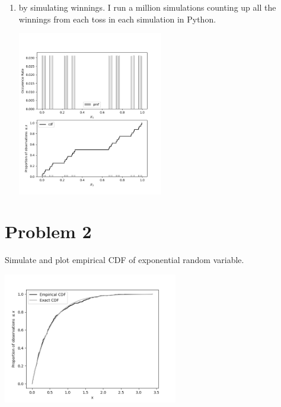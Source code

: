 \documentclass{article}
\newcommand{\1}{\mathbf{1}}
\begin{document}
\begin{enumerate}
	\newpage
	\item by simulating winnings. I run a million simulations counting up all the winnings from each toss in each simulation in Python.
	\begin{center}
    \includegraphics[width=2.5in]{STATS509/HW2/HW2Figures/problem1c.png}
    \end{center}
    
\end{enumerate}


\newpage
\section*{Problem 2}
Simulate and plot empirical CDF of exponential random variable.
\begin{center}
    \includegraphics[width=3in]{STATS509/HW2/HW2Figures/problem2.png}
\end{center}



\newpage
\end{document}
